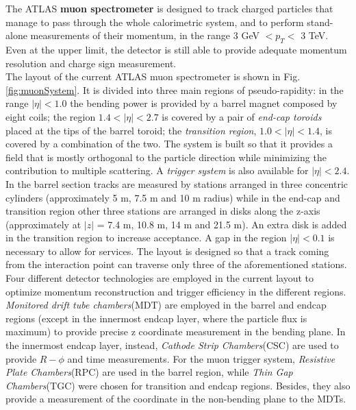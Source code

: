 \documentclass[a4paper,twoside,12pt]{book}
\begin{document}
The ATLAS \textbf{muon spectrometer} is designed to track charged particles that manage to pass through the whole calorimetric system, and to perform stand-alone measurements of their momentum, in the range 3 GeV $< p_{T} <$ 3 TeV. Even at the upper limit, the detector is still able to provide adequate momentum resolution and charge sign measurement\cite{muon_tdr}\cite{Aad:2008zzm}.\\

The layout of the current  ATLAS muon spectrometer is shown in Fig.\ref{fig:muonSystem}. It is divided into three main regions of pseudo-rapidity: in the range $|\eta| < 1.0$ the bending power
is provided by a barrel magnet composed by eight coils; the region $1.4 < |\eta| < 2.7$ is covered by a pair of \textit{end-cap toroids} placed at the tips of the barrel toroid; the \textit{transition
region}, $1.0 < |\eta| < 1.4$, is covered by a combination of the two. The system is built so that it provides a field that is mostly orthogonal to the particle direction while minimizing the contribution to multiple scattering. A \textit{trigger system} is also available for $|\eta| < 2.4$. \\

In the barrel section tracks are measured by stations arranged in three concentric cylinders (approximately 5 m, 7.5 m and 10 m radius) while in the end-cap and
transition region other three stations are arranged in disks along the z-axis (approximately at  $|z|$ = 7.4 m, 10.8 m, 14 m and 21.5 m). An extra disk is added in the transition
region to increase acceptance. A gap in the region $|\eta| < 0.1$ is necessary to allow for services. The layout is designed so that a track coming from the interaction point can traverse only three of the aforementioned stations.\\

Four different detector technologies are employed in the current layout to optimize momentum reconstruction and trigger efficiency in the 
different regions.  \textit{Monitored drift tube chambers}(MDT) are employed in the barrel and endcap regions (except in the innermost endcap layer, where the particle flux is maximum) to provide precise z coordinate measurement in the bending plane. In the innermost endcap layer, instead, \textit{Cathode Strip Chambers}(CSC) are used to provide $R-\phi$ and time measurements. For the muon trigger system, \textit{Resistive Plate Chambers}(RPC) are used in the barrel region, while \textit{Thin Gap Chambers}(TGC) were chosen for transition and endcap
regions. Besides, they also provide a measurement of the coordinate in the non-bending plane to the MDTs. 
\end{document}
